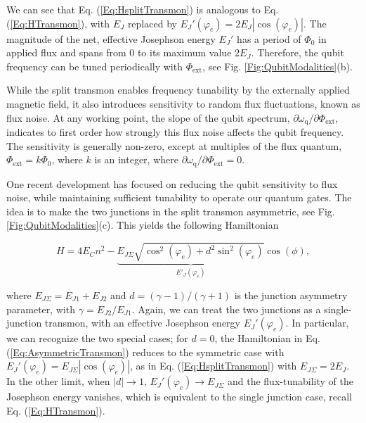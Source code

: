 \documentclass[aip,apr,twocolumn,showpacs,superscriptaddress,groupedaddress,nofootinbib,reprint]{revtex4-1}  %
\newcommand{\freq}{\omega_\text{q}}
\begin{document}
We can see that Eq. (\ref{Eq:HsplitTransmon}) is analogous to Eq. (\ref{Eq:HTransmon}), with $E_J$ replaced by $E_{J}'(\varphi_e) = 2E_J \left|\cos\left(\varphi_e\right)\right|$. The magnitude of the net, effective Josephson energy $E_{J}'$ has a period of $\Phi_0$ in applied flux and spans from $0$ to its maximum value $2E_J$. Therefore, the qubit frequency can be tuned periodically with $\Phi_{\text{ext}}$, see Fig. \ref{Fig:QubitModalities}(b).

While the split transmon enables frequency tunability by the externally applied magnetic field, it also introduces sensitivity to random flux fluctuations, known as flux noise. At any working point, the slope of the qubit spectrum, $\partial \freq/\partial\Phi_{\text{ext}}$, indicates to first order how strongly this flux noise affects the qubit frequency. The sensitivity is generally non-zero, except at multiples of the flux quantum, $\Phi_{\text{ext}} = k\Phi_{\text{0}}$, where $k$ is an integer, where $\partial \freq/\partial\Phi_{\text{ext}} = 0$.

One recent development has focused on reducing the qubit sensitivity to flux noise, while maintaining sufficient tunability to operate our quantum gates. The idea is to make the two junctions in the split transmon asymmetric\cite{Hutchings2017}, see Fig. \ref{Fig:QubitModalities}(c). This yields the following Hamiltonian

\begin{equation}
H = 4E_Cn^2 - \underbrace{{E_{J\Sigma}\sqrt{\cos^2(\varphi_e) + d^2\sin^2(\varphi_e)}}}_{E'_J(\varphi_e)}\cos(\phi),
\label{Eq:AsymmetricTransmon}
\end{equation}

\noindent where $E_{J\Sigma} = E_{J1} + E_{J2}$ and $d = (\gamma - 1)/(\gamma + 1)$ is the junction asymmetry parameter, with $\gamma = E_{J2}/E_{J1}$. Again, we can treat the two junctions as a single-junction transmon, with an effective Josephson energy $E_{J}'(\varphi_e)$. In particular, we can recognize the two special cases; for $d = 0$, the Hamiltonian in Eq. (\ref{Eq:AsymmetricTransmon}) reduces to the symmetric case with $E_{J}'(\varphi_e) = E_{J\Sigma}\left|\cos(\varphi_e)\right|$, as in Eq. (\ref{Eq:HsplitTransmon}) with $E_{J\Sigma} = 2E_J$. In the other limit, when $|d| \rightarrow 1$, $E_{J}'(\varphi_e) \rightarrow E_{J\Sigma}$ and the flux-tunability of the Josephson energy vanishes, which is equivalent to the single junction case, recall Eq. (\ref{Eq:HTransmon}).
\end{document}
